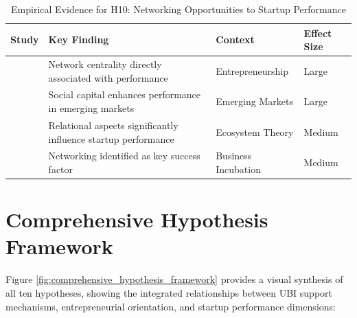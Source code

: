 \documentclass[../Main.tex]{subfiles}
\begin{document}
    \begin{table}[H]
        \centering
        \caption{Empirical Evidence for H10: Networking Opportunities to Startup Performance}
        \label{tab:h10_evidence}
        \begin{tabular}{|p{3cm}|p{4cm}|p{3cm}|p{2cm}|}
            \hline
            \textbf{Study} & \textbf{Key Finding} & \textbf{Context} & \textbf{Effect Size} \\
            \hline
            \autocite{stam2008entrepreneurial} & Network centrality directly associated with performance & Entrepreneurship & Large \\
            \hline
            \autocite{batjargal2003social} & Social capital enhances performance in emerging markets & Emerging Markets & Large \\
            \hline
            \autocite{spigel2017relational} & Relational aspects significantly influence startup performance & Ecosystem Theory & Medium \\
            \hline
            \autocite{theodorakopoulos2014business} & Networking identified as key success factor & Business Incubation & Medium \\
            \hline
        \end{tabular}
    \end{table}

    \section{Comprehensive Hypothesis Framework}
    Figure \ref{fig:comprehensive_hypothesis_framework} provides a visual synthesis of all ten hypotheses, showing the integrated relationships between UBI support mechanisms, entrepreneurial orientation, and startup performance dimensions:
\end{document}

